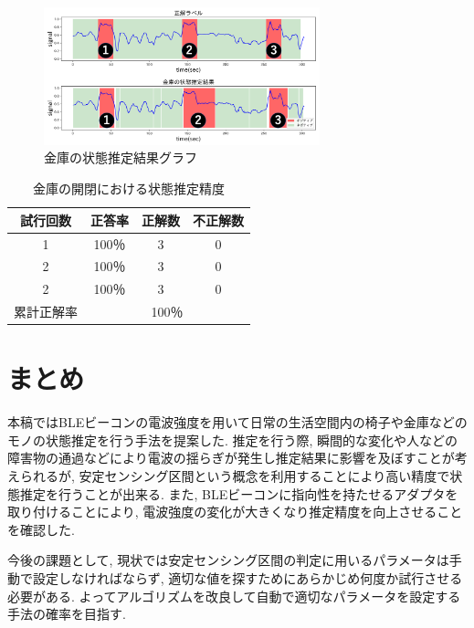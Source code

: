 \documentclass[Japanese]{dicomopapers}
\begin{document}
\begin{figure}[ht]
    \centering
    \includegraphics[width=8cm]{kinko_graph.png}
    \caption{金庫の状態推定結果グラフ}
    \label{kinko_graph}
\end{figure}

\begin{table}[htb]
    \begin{center}
        \caption{金庫の開閉における状態推定精度}
        \label{kinko_fig}
        \begin{tabular}{|c|c|c|c|} \hline
        試行回数 & 正答率 & 正解数 & 不正解数 \\ \hline
        1 & 100％ & 3 & 0 \\ \hline
        2 & 100％ & 3 & 0 \\ \hline
        2 & 100％ & 3 & 0 \\ \hline \hline
        累計正解率 & \multicolumn{3}{c|}{100％} \\ \hline
        \end{tabular}
    \end{center}
\end{table}


\section{まとめ}
本稿ではBLEビーコンの電波強度を用いて日常の生活空間内の椅子や金庫などのモノの状態推定を行う手法を提案した.
推定を行う際, 瞬間的な変化や人などの障害物の通過などにより電波の揺らぎが発生し推定結果に影響を及ぼすことが考えられるが, 安定センシング区間という概念を利用することにより高い精度で状態推定を行うことが出来る.
また, BLEビーコンに指向性を持たせるアダプタを取り付けることにより, 電波強度の変化が大きくなり推定精度を向上させることを確認した.

今後の課題として, 現状では安定センシング区間の判定に用いるパラメータは手動で設定しなければならず, 適切な値を探すためにあらかじめ何度か試行させる必要がある.
よってアルゴリズムを改良して自動で適切なパラメータを設定する手法の確率を目指す.
\end{document}

